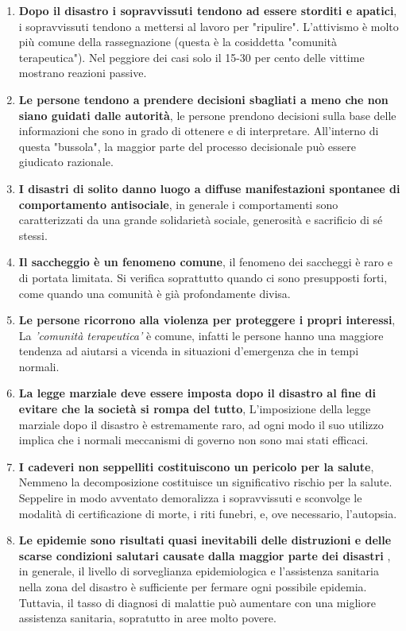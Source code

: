 \begin{enumerate}
\item\textbf{Dopo il disastro i sopravvissuti tendono ad essere storditi e apatici}, i sopravvissuti tendono a mettersi al lavoro per "ripulire". L'attivismo è molto più comune della rassegnazione (questa è la cosiddetta "comunità terapeutica"). Nel peggiore dei casi solo il 15-30 per cento delle vittime mostrano reazioni passive.
\item\textbf{Le persone tendono a prendere decisioni sbagliati a meno che non siano guidati dalle autorità}, le persone prendono decisioni sulla base delle informazioni che sono in grado di ottenere e di interpretare. All'interno di questa "bussola", la maggior parte del processo decisionale può essere giudicato razionale.
\item\textbf{ I disastri di solito danno luogo a diffuse manifestazioni spontanee di comportamento antisociale}, in generale i comportamenti sono caratterizzati da una grande solidarietà sociale, generosità e sacrificio di sé stessi.
\item\textbf{Il saccheggio è un fenomeno comune}, il fenomeno dei saccheggi è raro e di portata limitata. Si verifica soprattutto quando ci sono presupposti forti, come quando una comunità è già profondamente divisa.
\item\textbf{Le persone ricorrono alla violenza per proteggere i propri interessi}, La \textit{'comunità terapeutica'} è comune, infatti le persone hanno una maggiore tendenza ad aiutarsi a vicenda in situazioni d'emergenza che in tempi normali.
\item\textbf{La legge marziale deve essere imposta dopo il disastro al fine di evitare che la società si rompa del tutto}, L'imposizione della legge marziale dopo il disastro è estremamente raro, ad ogni modo il suo utilizzo implica che i normali meccanismi di governo non sono mai stati efficaci.
\item\textbf{I cadeveri non seppelliti costituiscono un pericolo per la salute}, Nemmeno la decomposizione costituisce un significativo rischio per la salute. Seppelire in modo avventato demoralizza i sopravvissuti e sconvolge le modalità di certificazione di morte, i riti funebri, e, ove necessario, l'autopsia.
\item\textbf{Le epidemie sono risultati quasi inevitabili delle distruzioni e delle scarse condizioni salutari causate dalla maggior parte dei disastri }, in generale, il livello di sorveglianza epidemiologica e l'assistenza sanitaria nella zona del disastro è sufficiente per fermare ogni possibile epidemia. Tuttavia, il tasso di diagnosi di malattie può aumentare con una migliore assistenza sanitaria, sopratutto in aree molto povere.

\end{enumerate}
